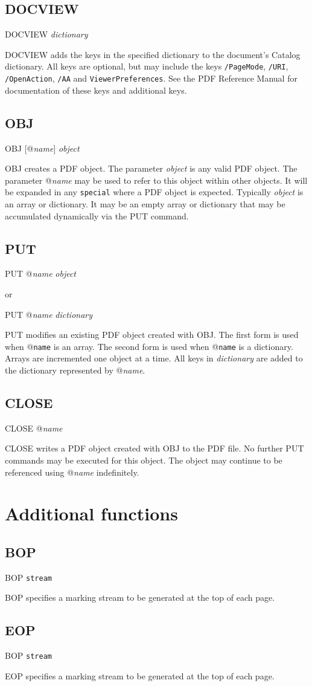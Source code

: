 \subsection{DOCVIEW}
DOCVIEW {\it dictionary}

DOCVIEW adds the keys in the specified dictionary to the
document's Catalog dictionary.  All keys are optional, but may include
the keys {\tt /PageMode},
{\tt /URI}, {\tt /OpenAction}, {\tt /AA}
and {\tt ViewerPreferences}.  See the PDF Reference Manual
for documentation of these keys and additional keys.

\subsection{OBJ}

OBJ [@{\it name}] {\it object}

OBJ creates a PDF object.  The parameter {\it object} is any valid PDF object.  The parameter @{\it name}
may be used to refer to this object within other objects.  It
will be expanded in any {\tt special} where a PDF object is expected.
Typically {\it object} is an array or dictionary.  It may be an empty array or
dictionary that may be accumulated dynamically via the PUT command.

\subsection{PUT}
PUT @{\it name} {\it object}

or 

PUT @{\it name} {\it dictionary}

PUT modifies an existing PDF object created with OBJ.
The first form is used when @{\tt name} is an array.  The second
form is used when @{\tt name} is a dictionary.  Arrays are
incremented one object at a time.  All keys in {\it dictionary}
are added to the dictionary represented by @{\it name}.

\subsection{CLOSE}

CLOSE @{\it name}

CLOSE writes a PDF object created with OBJ to the PDF file.
No further PUT commands may be executed for this object.
The object may continue to be referenced using @{\it name}
indefinitely.

\section{Additional functions}
\subsection{BOP}

BOP {\tt stream}

BOP specifies a marking stream to be generated at the top of each page.


\subsection{EOP}

BOP {\tt stream}

EOP specifies a marking stream to be generated at the top of each page.

\bye
